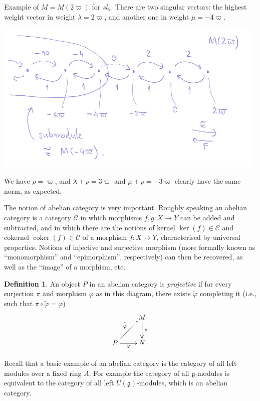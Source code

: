 \documentclass[12pt]{article}
\theoremstyle{plain}
\theoremstyle{definition}
\newtheorem{defn}{Definition}[section]
\numberwithin{equation}{section}
\DeclareMathOperator{\coker}{coker}
\newcommand{\wtil}[1]{\widetilde{#1}}
\newcommand{\la}{\lambda}
\newcommand{\g}{\mathfrak{g}}
\newcommand{\CC}{\mathcal{C}}
\begin{document}
Example of $M = M(2\varpi)$ for $sl_2$. There are two singular vectors: the highest weight vector in weight $\la = 2\varpi$, and another one in weight $\mu = -4\varpi$.
\begin{center}
\includegraphics[width=130mm]{M2-M-4-inclusion.png}
\end{center}
We have $\rho = \varpi$, and $\la+\rho = 3\varpi$ and $\mu+\rho = -3\varpi$ clearly have the same norm, as expected.


The notion of abelian category is very important. Roughly speaking an abelian category is a category $\CC$ in which morphisms $f, g : X \rightarrow Y$ can be added and subtracted, and in which there are the notions of kernel $\ker(f) \in \CC$ and cokernel $\coker(f) \in \CC$ of a morphism $f : X \rightarrow Y$, characterised by universal properties. Notions of injective and surjective morphism (more formally known as ``monomorphism'' and ``epimorphism'', respectively) can then be recovered, as well as the ``image'' of a morphism, etc.
\begin{defn}
An object $P$ in an abelian category is \emph{projective} if for every surjection $\pi$ and morphism $\varphi$ as in this diagram, there exists $\widetilde \varphi$ completing it (i.e., such that $\pi \circ \wtil{\varphi} = \varphi$)
\begin{align*}
\xymatrix{
 & M \ar@{->>}[d]^{\pi} \\
%
P \ar@{->}[r]_{\varphi} \ar@{->}[ur]^{\wtil{\varphi}} & N \\
}
\end{align*}
\end{defn}

Recall that a basic example of an abelian category is the category of all left modules over a fixed ring $A$. For example the category of all $\g$-modules is equivalent to the category of all left $U(\g)$-modules, which is an abelian category.
\end{document}
